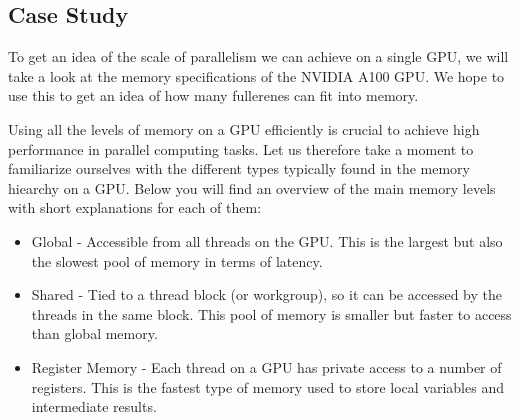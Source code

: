 \subsection{Case Study}

To get an idea of the scale of parallelism we can achieve on a single GPU, we will take a look at the memory specifications of the NVIDIA A100 GPU. We hope to use this to get an idea of how many fullerenes can fit into memory.

Using all the levels of memory on a GPU efficiently is crucial to achieve high performance in parallel computing tasks. Let us therefore take a moment to familiarize ourselves with the different types typically found in the memory hiearchy on a GPU. Below you will find an overview of the main memory levels with short explanations for each of them:

\begin{itemize}
  \item Global - Accessible from all threads on the GPU. This is the largest but also the slowest pool of memory in terms of latency.
  \item Shared - Tied to a thread block (or workgroup), so it can be accessed by the threads in the same block. This pool of memory is smaller but faster to access than global memory.
  \item Register Memory - Each thread on a GPU has private access to a number of registers. This is the fastest type of memory used to store local variables and intermediate results.
\end{itemize}



